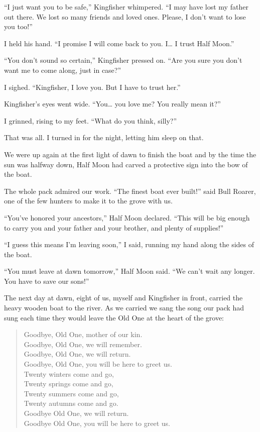 ``I just want you to be safe,'' Kingfisher whimpered. ``I may have lost my father out there. We lost so many friends and loved ones. Please, I don't want to lose you too!''

I held his hand. ``I promise I will come back to you. I\ldots{} I trust Half Moon.''

``You don't sound so certain,'' Kingfisher pressed on. ``Are you sure you don't want me to come along, just in case?''

I sighed. ``Kingfisher, I love you. But I have to trust her.''

Kingfisher's eyes went wide. ``You\ldots{} you love me? You really mean it?''

I grinned, rising to my feet. ``What do you think, silly?''

That was all. I turned in for the night, letting him sleep on that.

\secdiv

\noindent We were up again at the first light of dawn to finish the boat and by the time the sun was halfway down, Half Moon had carved a protective sign into the bow of the boat.

The whole pack admired our work. ``The finest boat ever built!'' said Bull Roarer, one of the few hunters to make it to the grove with us.

``You've honored your ancestors,'' Half Moon declared. ``This will be big enough to carry you and your father and your brother, and plenty of supplies!''

``I guess this means I'm leaving soon,'' I said, running my hand along the sides of the boat.

``You must leave at dawn tomorrow,'' Half Moon said. ``We can't wait any longer. You have to save our sons!''

\secdiv

\noindent The next day at dawn, eight of us, myself and Kingfisher in front, carried the heavy wooden boat to the river. As we carried we sang the song our pack had sung each time they would leave the Old One at the heart of the grove:

\vspace{-0.5em}

\begin{verse}
Goodbye, Old One, mother of our kin. \\
Goodbye, Old One, we will remember. \\
Goodbye, Old One, we will return. \\
Goodbye, Old One, you will be here to greet us. \\
Twenty winters come and go, \\
Twenty springs come and go, \\
Twenty summers come and go, \\
Twenty autumns come and go. \\
Goodbye Old One, we will return. \\
Goodbye Old One, you will be here to greet us.
\end{verse}

